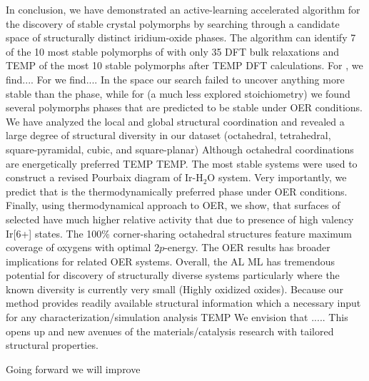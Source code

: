 

%

In conclusion, we have demonstrated an active-learning accelerated algorithm for the discovery of stable crystal polymorphs by searching through a candidate space of structurally distinct iridium-oxide phases.
The algorithm can identify \num{7} of the \num{10} most stable polymorphs of \IrOthree with only \num{35} DFT bulk relaxations and TEMP of the most \num{10} stable \IrOtwo polymorphs after TEMP DFT calculations.
%
For \IrOtwo, we find....  For \IrOthree we find....
In the \IrOtwo space our search failed to uncover anything more stable than the \rIrOtwo phase,
while for \IrOthree (a much less explored stoichiometry) we found several polymorphs phases that are predicted to be stable under OER conditions.
We have analyzed the local and global structural coordination and revealed a large degree of structural diversity in our dataset (octahedral, tetrahedral, square-pyramidal, cubic, and square-planar)
Although octahedral coordinations are energetically preferred TEMP TEMP.
%
The most stable systems were used to construct a revised Pourbaix diagram of Ir-H$_2$O system.
%
Very importantly, we predict that \IrOthree is the thermodynamically preferred phase under OER conditions.
%
Finally, using thermodynamical approach to OER, we show,
that surfaces of selected \IrOthree have much higher relative activity that \IrOtwo due to presence of high valency Ir[6+] states.
%
The \num{100}\% corner-sharing octahedral structures feature maximum coverage of oxygens with optimal $2p$-energy.
%
The OER results has broader implications for related OER systems.
%
Overall, the AL ML has tremendous potential for discovery of structurally diverse systems particularly where the known diversity is currently very small (Highly oxidized oxides).
%
Because our method provides readily available structural information which a necessary input for any characterization/simulation analysis TEMP We envision that .....
%
This opens up and new avenues of the materials/catalysis research with tailored structural properties.


Going forward we will improve


